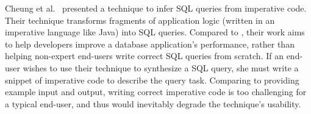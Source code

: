 Cheung et al.~\cite{abs-1208-2013} presented a technique to infer SQL
queries from imperative code. Their technique transforms
fragments of application logic (written in an imperative language
like Java) into SQL queries. 
Compared to \ourtool, their work aims to help developers
improve a database application's performance,
rather than helping non-expert end-users
write correct SQL queries from scratch. 
If an end-user wishes to use their technique to 
synthesize a SQL query, she must write a snippet of
imperative code to describe the query task.
Comparing to providing example input
and output, writing correct imperative code is too challenging
for a typical end-user, and thus would
inevitably degrade the technique's usability.


